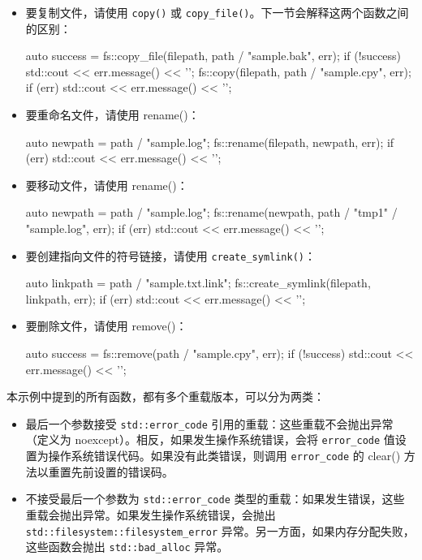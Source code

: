 \begin{itemize}
\item
要复制文件，请使用 \verb|copy()| 或 \verb|copy_file()|。下一节会解释这两个函数之间的区别：

\begin{cpp}
auto success = fs::copy_file(filepath, path / "sample.bak", err);
if (!success) std::cout << err.message() << '\n';
fs::copy(filepath, path / "sample.cpy", err);
if (err) std::cout << err.message() << '\n';
\end{cpp}

\item
要重命名文件，请使用 rename()：

\begin{cpp}
auto newpath = path / "sample.log";
fs::rename(filepath, newpath, err);
if (err) std::cout << err.message() << '\n';
\end{cpp}

\item
要移动文件，请使用 rename()：

\begin{cpp}
auto newpath = path / "sample.log";
fs::rename(newpath, path / "tmp1" / "sample.log", err);
if (err) std::cout << err.message() << '\n';
\end{cpp}

\item
要创建指向文件的符号链接，请使用 \verb|create_symlink()|：

\begin{cpp}
auto linkpath = path / "sample.txt.link";
fs::create_symlink(filepath, linkpath, err);
if (err) std::cout << err.message() << '\n';
\end{cpp}

\item
要删除文件，请使用 remove()：

\begin{cpp}
auto success = fs::remove(path / "sample.cpy", err);
if (!success) std::cout << err.message() << '\n';
\end{cpp}
\end{itemize}


本示例中提到的所有函数，都有多个重载版本，可以分为两类：

\begin{itemize}
\item
最后一个参数接受 \verb|std::error_code| 引用的重载：这些重载不会抛出异常（定义为 noexcept）。相反，如果发生操作系统错误，会将 \verb|error_code| 值设置为操作系统错误代码。如果没有此类错误，则调用 \verb|error_code| 的 clear() 方法以重置先前设置的错误码。

\item
不接受最后一个参数为 \verb|std::error_code| 类型的重载：如果发生错误，这些重载会抛出异常。如果发生操作系统错误，会抛出 \verb|std::filesystem::filesystem_error| 异常。另一方面，如果内存分配失败，这些函数会抛出 \verb|std::bad_alloc| 异常。
\end{itemize}


